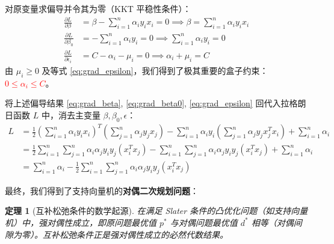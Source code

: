 \documentclass[UTF8]{ctexart}
\newtheorem{theorem}{定理}[section]
\numberwithin{equation}{section}
\begin{document}
对原变量求偏导并令其为零（KKT 平稳性条件）：
\begin{align}
    \frac{\partial L}{\partial \beta} &= \beta - \sum_{i=1}^n \alpha_i y_i x_i = 0 \implies \beta = \sum_{i=1}^n \alpha_i y_i x_i \label{eq:grad_beta} \\
    \frac{\partial L}{\partial \beta_0} &= -\sum_{i=1}^n \alpha_i y_i = 0 \implies \sum_{i=1}^n \alpha_i y_i = 0 \label{eq:grad_beta0} \\
    \frac{\partial L}{\partial \epsilon_i} &= C - \alpha_i - \mu_i = 0 \implies \alpha_i + \mu_i = C \label{eq:grad_epsilon}
\end{align}
由 $\mu_i \ge 0$ 及等式 \eqref{eq:grad_epsilon}，我们得到了极其重要的盒子约束：\textcolor{red}{$0 \le \alpha_i \le C$}。

将上述偏导结果 \eqref{eq:grad_beta}, \eqref{eq:grad_beta0}, \eqref{eq:grad_epsilon} 回代入拉格朗日函数 $L$ 中，消去主变量 $\beta, \beta_0, \epsilon$：
\begin{align*}
    L &= \frac{1}{2} \left( \sum_{i=1}^n \alpha_i y_i x_i \right)^T \left( \sum_{j=1}^n \alpha_j y_j x_j \right) - \sum_{i=1}^n \alpha_i y_i \left( \sum_{j=1}^n \alpha_j y_j x_j^T x_i \right) + \sum_{i=1}^n \alpha_i \\
    &= \frac{1}{2} \sum_{i=1}^n \sum_{j=1}^n \alpha_i \alpha_j y_i y_j (x_i^T x_j) - \sum_{i=1}^n \sum_{j=1}^n \alpha_i \alpha_j y_i y_j (x_i^T x_j) + \sum_{i=1}^n \alpha_i \\
    &= \sum_{i=1}^n \alpha_i - \frac{1}{2} \sum_{i=1}^n \sum_{j=1}^n \alpha_i \alpha_j y_i y_j (x_i^T x_j)
\end{align*}

最终，我们得到了支持向量机的\textbf{对偶二次规划问题}：
\begin{center}
\end{center}



\begin{theorem}[互补松弛条件的数学起源]
在满足 Slater 条件的凸优化问题（如支持向量机）中，强对偶性成立，即原问题最优值 $p^*$ 与对偶问题最优值 $d^*$ 相等（对偶间隙为零）。互补松弛条件正是强对偶性成立的必然代数结果。
\end{theorem}
\end{document}
